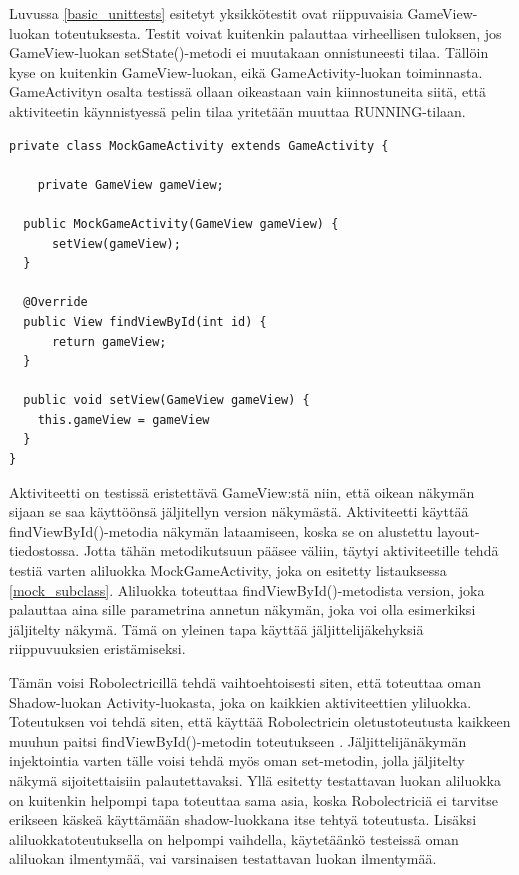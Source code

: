 Luvussa \ref{basic_unittests} esitetyt yksikkötestit ovat riippuvaisia GameView-luokan toteutuksesta. Testit voivat kuitenkin palauttaa virheellisen tuloksen, jos GameView-luokan setState()-metodi ei muutakaan onnistuneesti tilaa. Tällöin kyse on kuitenkin GameView-luokan, eikä GameActivity-luokan toiminnasta. GameActivityn osalta testissä ollaan oikeastaan vain kiinnostuneita siitä, että aktiviteetin käynnistyessä pelin tilaa yritetään muuttaa RUNNING-tilaan.

\begin{lstlisting}[float,label=mock_subclass, caption=Jäljittelijäaliluokka]
private class MockGameActivity extends GameActivity {
	
	private GameView gameView;

  public MockGameActivity(GameView gameView) {
	  setView(gameView);
  }

  @Override
  public View findViewById(int id) {
	  return gameView;
  }
  
  public void setView(GameView gameView) {
    this.gameView = gameView
  }
}
\end{lstlisting}

Aktiviteetti on testissä eristettävä GameView:stä niin, että oikean näkymän sijaan se saa käyttöönsä jäljitellyn version näkymästä. Aktiviteetti käyttää findViewById()-metodia näkymän lataamiseen, koska se on alustettu layout-tiedostossa. Jotta tähän metodikutsuun pääsee väliin, täytyi aktiviteetille tehdä testiä varten aliluokka MockGameActivity, joka on esitetty listauksessa \ref{mock_subclass}. Aliluokka toteuttaa findViewById()-metodista version, joka palauttaa aina sille parametrina annetun näkymän, joka voi olla esimerkiksi jäljitelty näkymä. Tämä on yleinen tapa käyttää jäljittelijäkehyksiä riippuvuuksien eristämiseksi.

Tämän voisi Robolectricillä tehdä vaihtoehtoisesti siten, että toteuttaa oman Shadow-luokan Activity-luokasta, joka on kaikkien aktiviteettien yliluokka. Toteutuksen voi tehdä siten, että käyttää Robolectricin oletustoteutusta kaikkeen muuhun paitsi findViewById()-metodin toteutukseen \cite{robolectric}. Jäljittelijänäkymän injektointia varten tälle voisi tehdä myös oman set-metodin, jolla jäljitelty näkymä sijoitettaisiin palautettavaksi. Yllä esitetty testattavan luokan aliluokka on kuitenkin helpompi tapa toteuttaa sama asia, koska Robolectriciä ei tarvitse erikseen käskeä käyttämään shadow-luokkana itse tehtyä toteutusta. Lisäksi aliluokkatoteutuksella on helpompi vaihdella, käytetäänkö testeissä oman aliluokan ilmentymää, vai varsinaisen testattavan luokan ilmentymää.

